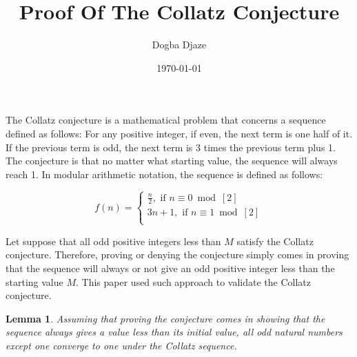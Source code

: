 \documentclass[14pt,a4paper]{article}
\title{Proof Of The Collatz Conjecture}
\author{Dogba Djaze}
\affil{\small{Aerospace Engineering Department, \\ University of Bristol}}
\date{\today}
\newtheorem{lemma}[theorem]{Lemma}
\theoremstyle{plain}
\begin{document}
\maketitle

	The Collatz conjecture is a mathematical problem that concerns a sequence defined as follows: For any positive integer, if even, the next term is one half of it. If the previous term is odd, the next term is 3 times the previous term plus 1. The conjecture is that no matter what starting value, the sequence will always reach 1. In modular arithmetic notation, the sequence is defined as follows:
	
	\[
	f(n) = 
	\begin{cases}
	\frac{n}{2} , \text{ if } n \equiv 0 \bmod[2]\\
	3n+1, \text{ if } n \equiv 1 \bmod[2]\\
	\end{cases}
	\]
	
    Let suppose that all odd positive integers less than $M$ satisfy the Collatz conjecture. Therefore, proving or denying the conjecture simply comes in proving that the sequence will always or not give an odd positive integer less than the starting value $M$. This paper used such approach to validate the Collatz conjecture.\\

\begin{lemma}
    Assuming that proving the conjecture comes in showing that the sequence always gives a value less than its initial value, all odd natural numbers except one converge to one under the Collatz sequence.
\end{lemma}
	
\end{document}
